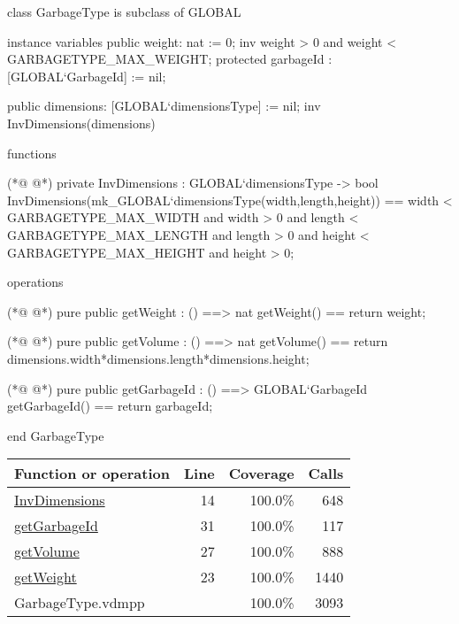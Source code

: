 \begin{vdmpp}[breaklines=true]
class GarbageType is subclass of GLOBAL

instance variables
public weight: nat := 0; 
inv weight > 0 and weight < GARBAGETYPE_MAX_WEIGHT;
protected garbageId : [GLOBAL`GarbageId] := nil;


public dimensions: [GLOBAL`dimensionsType] := nil;
inv InvDimensions(dimensions)

functions

(*@
\label{InvDimensions:14}
@*)
private InvDimensions : GLOBAL`dimensionsType -> bool
InvDimensions(mk_GLOBAL`dimensionsType(width,length,height)) == 
        width < GARBAGETYPE_MAX_WIDTH and width > 0 and   
        length < GARBAGETYPE_MAX_LENGTH and length > 0 and
        height < GARBAGETYPE_MAX_HEIGHT and height > 0;


operations

(*@
\label{getWeight:23}
@*)
pure public getWeight : () ==> nat
getWeight() == 
    return weight;

(*@
\label{getVolume:27}
@*)
pure public getVolume : () ==> nat
getVolume() ==
    return dimensions.width*dimensions.length*dimensions.height;

(*@
\label{getGarbageId:31}
@*)
pure public getGarbageId : () ==> GLOBAL`GarbageId
getGarbageId() ==
    return garbageId;

end GarbageType
\end{vdmpp}
\bigskip
\begin{longtable}{|l|r|r|r|}
\hline
Function or operation & Line & Coverage & Calls \\
\hline
\hline
\hyperref[InvDimensions:14]{InvDimensions} & 14&100.0\% & 648 \\
\hline
\hyperref[getGarbageId:31]{getGarbageId} & 31&100.0\% & 117 \\
\hline
\hyperref[getVolume:27]{getVolume} & 27&100.0\% & 888 \\
\hline
\hyperref[getWeight:23]{getWeight} & 23&100.0\% & 1440 \\
\hline
\hline
GarbageType.vdmpp & & 100.0\% & 3093 \\
\hline
\end{longtable}

